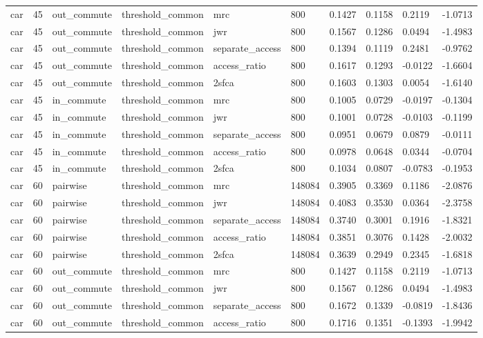 \begin{table}[htbp]
\begin{tabular}{llllllllll}
car & 45 & out\_commute & threshold\_common & mrc & 800 & 0.1427 & 0.1158 & 0.2119 & -1.0713 \\
car & 45 & out\_commute & threshold\_common & jwr & 800 & 0.1567 & 0.1286 & 0.0494 & -1.4983 \\
car & 45 & out\_commute & threshold\_common & separate\_access & 800 & 0.1394 & 0.1119 & 0.2481 & -0.9762 \\
car & 45 & out\_commute & threshold\_common & access\_ratio & 800 & 0.1617 & 0.1293 & -0.0122 & -1.6604 \\
car & 45 & out\_commute & threshold\_common & 2sfca & 800 & 0.1603 & 0.1303 & 0.0054 & -1.6140 \\
car & 45 & in\_commute & threshold\_common & mrc & 800 & 0.1005 & 0.0729 & -0.0197 & -0.1304 \\
car & 45 & in\_commute & threshold\_common & jwr & 800 & 0.1001 & 0.0728 & -0.0103 & -0.1199 \\
car & 45 & in\_commute & threshold\_common & separate\_access & 800 & 0.0951 & 0.0679 & 0.0879 & -0.0111 \\
car & 45 & in\_commute & threshold\_common & access\_ratio & 800 & 0.0978 & 0.0648 & 0.0344 & -0.0704 \\
car & 45 & in\_commute & threshold\_common & 2sfca & 800 & 0.1034 & 0.0807 & -0.0783 & -0.1953 \\
car & 60 & pairwise & threshold\_common & mrc & 148084 & 0.3905 & 0.3369 & 0.1186 & -2.0876 \\
car & 60 & pairwise & threshold\_common & jwr & 148084 & 0.4083 & 0.3530 & 0.0364 & -2.3758 \\
car & 60 & pairwise & threshold\_common & separate\_access & 148084 & 0.3740 & 0.3001 & 0.1916 & -1.8321 \\
car & 60 & pairwise & threshold\_common & access\_ratio & 148084 & 0.3851 & 0.3076 & 0.1428 & -2.0032 \\
car & 60 & pairwise & threshold\_common & 2sfca & 148084 & 0.3639 & 0.2949 & 0.2345 & -1.6818 \\
car & 60 & out\_commute & threshold\_common & mrc & 800 & 0.1427 & 0.1158 & 0.2119 & -1.0713 \\
car & 60 & out\_commute & threshold\_common & jwr & 800 & 0.1567 & 0.1286 & 0.0494 & -1.4983 \\
car & 60 & out\_commute & threshold\_common & separate\_access & 800 & 0.1672 & 0.1339 & -0.0819 & -1.8436 \\
car & 60 & out\_commute & threshold\_common & access\_ratio & 800 & 0.1716 & 0.1351 & -0.1393 & -1.9942 \\

\end{tabular}
\end{table}
